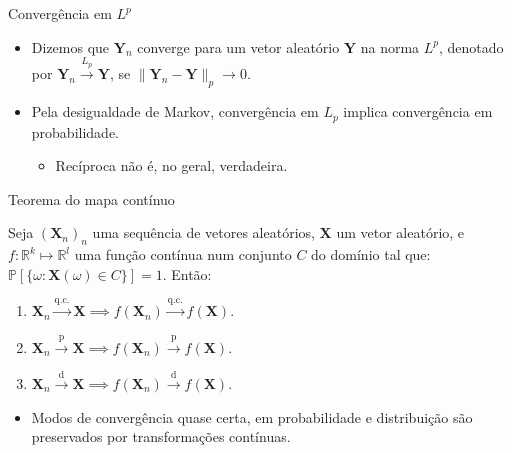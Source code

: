 \documentclass[11pt]{beamer}
\begin{document}
	\begin{frame}{Convergência em $L^p$}
		\begin{itemize}
			\item 		Dizemos que $\boldsymbol{Y}_n$ converge para um vetor aleatório $\boldsymbol{Y}$ na norma $L^p$, denotado por $\boldsymbol{Y}_n \overset{{L}_p}{\to} \boldsymbol{Y}$, se $\lVert  \boldsymbol{Y}_n -\boldsymbol{Y}\rVert_p \to 0$.
			\item Pela desigualdade de Markov, convergência em $L_p$ implica convergência em probabilidade.
			\begin{itemize}
				\item Recíproca não é, no geral, verdadeira.
			\end{itemize} 
		\end{itemize}

	\end{frame}
	
	\begin{frame}{Teorema do mapa contínuo}
	\begin{theorem}
		Seja $(\boldsymbol{X}_n)_n$ uma sequência de vetores aleatórios, $\boldsymbol{X}$ um vetor aleatório, e $f:\mathbb{R}^k \mapsto \mathbb{R}^l$ uma função contínua num conjunto $C$ do domínio tal que:
		$\mathbb{P}[\{\omega:\boldsymbol{X}(\omega)\in C\}]=1$. Então:
		
		\begin{enumerate}
			\item $\boldsymbol{X}_n \overset{\text{q.c.}}{\to} \boldsymbol{X} \implies f(\boldsymbol{X}_n) \overset{\text{q.c.}}{\to} f(\boldsymbol{X} ) $.
			\item  $\boldsymbol{X}_n \overset{\text{p}}{\to} \boldsymbol{X} \implies f(\boldsymbol{X}_n) \overset{\text{p}}{\to} f(\boldsymbol{X} ) $.
			 \item $\boldsymbol{X}_n \overset{\text{d}}{\to} \boldsymbol{X} \implies f(\boldsymbol{X}_n) \overset{\text{d}}{\to} f(\boldsymbol{X} ) $.
		\end{enumerate}
	\end{theorem}
	\begin{itemize}
		\item Modos de convergência quase certa, em probabilidade e distribuição são preservados por transformações contínuas.
	\end{itemize}
	\end{frame}
	
\end{document}
